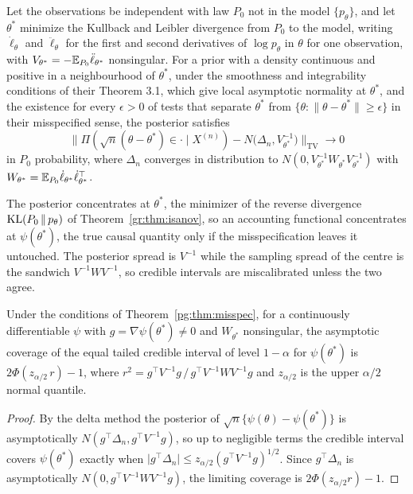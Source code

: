 \begin{theorem}\label{pg:thm:misspec}
Let the observations be independent with law $P_0$ not in the model $\{p_\theta\}$, and let $\theta^\ast$ minimize the Kullback and Leibler divergence from $P_0$ to the model, writing $\dot\ell_\theta$ and $\ddot\ell_\theta$ for the first and second derivatives of $\log p_\theta$ in $\theta$ for one observation, with $V_{\theta^\ast} = -\mathbb{E}_{P_0}\ddot\ell_{\theta^\ast}$ nonsingular. For a prior with a density continuous and positive in a neighbourhood of $\theta^\ast$, under the smoothness and integrability conditions of their Theorem 3.1, which give local asymptotic normality at $\theta^\ast$, and the existence for every $\epsilon>0$ of tests that separate $\theta^\ast$ from $\{\theta:\lVert\theta-\theta^\ast\rVert\ge\epsilon\}$ in their misspecified sense, the posterior satisfies
\[
\bigl\lVert\Pi(\sqrt n(\theta-\theta^\ast)\in\cdot\mid X^{(n)}) - N\bigl(\Delta_n, V_{\theta^\ast}^{-1}\bigr)\bigr\rVert_{\mathrm{TV}}\to0
\]
in $P_0$ probability, where $\Delta_n$ converges in distribution to $N(0, V_{\theta^\ast}^{-1}W_{\theta^\ast}V_{\theta^\ast}^{-1})$ with $W_{\theta^\ast} = \mathbb{E}_{P_0}\dot\ell_{\theta^\ast}\dot\ell_{\theta^\ast}^\top$.
\end{theorem}

The posterior concentrates at $\theta^\ast$, the minimizer of the reverse divergence $\mathrm{KL}(P_0\,\|\,p_\theta)$ of Theorem~\ref{gr:thm:isanov}, so an accounting functional concentrates at $\psi(\theta^\ast)$, the true causal quantity only if the misspecification leaves it untouched. The posterior spread is $V^{-1}$ while the sampling spread of the centre is the sandwich $V^{-1}WV^{-1}$, so credible intervals are miscalibrated unless the two agree.

\begin{corollary}\label{pg:cor:sandwich}
Under the conditions of Theorem~\ref{pg:thm:misspec}, for a continuously differentiable $\psi$ with $g = \nabla\psi(\theta^\ast)\neq0$ and $W_{\theta^\ast}$ nonsingular, the asymptotic coverage of the equal tailed credible interval of level $1-\alpha$ for $\psi(\theta^\ast)$ is $2\Phi(z_{\alpha/2}\,r)-1$, where $r^2 = g^\top V^{-1}g\,/\,g^\top V^{-1}WV^{-1}g$ and $z_{\alpha/2}$ is the upper $\alpha/2$ normal quantile.
\end{corollary}
\begin{proof}
By the delta method the posterior of $\sqrt n\{\psi(\theta)-\psi(\theta^\ast)\}$ is asymptotically $N(g^\top\Delta_n, g^\top V^{-1}g)$, so up to negligible terms the credible interval covers $\psi(\theta^\ast)$ exactly when $\lvert g^\top\Delta_n\rvert\le z_{\alpha/2}(g^\top V^{-1}g)^{1/2}$. Since $g^\top\Delta_n$ is asymptotically $N(0, g^\top V^{-1}WV^{-1}g)$, the limiting coverage is $2\Phi(z_{\alpha/2}r)-1$.
\end{proof}

